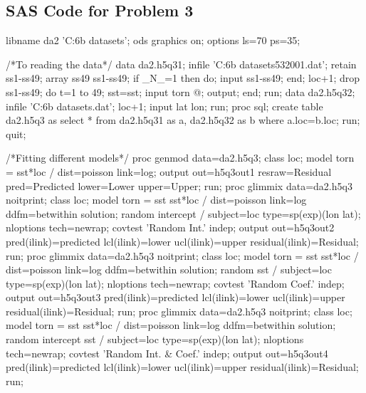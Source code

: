 \documentclass[letterpaper, 12pt]{article}
\begin{document}
\begin{appendices}
\section{SAS Code for Problem 3}
\begin{Sascode}[store=class]
libname da2 'C:\Users\psy6b\Desktop{} datasets'; 
ods graphics on; 
options ls=70 ps=35; 

/*To reading the data*/
data da2.h5q31;
   infile 'C:\Users\psy6b\Desktop{} datasets\ssttornado532001.dat';
   retain ss1-ss49;
   array ss{49} ss1-ss49;
   if _N_=1 then do; 
      input ss1-ss49;
   end;
   loc+1;
   drop ss1-ss49;
   do t=1 to 49;
      sst=ss{t};
      input torn @;
      output;
   end;
run;
data da2.h5q32;
   infile 'C:\Users\psy6b\Desktop{} datasets\MOtornlatlon.dat';
   loc+1;
   input lat lon;
   run;
proc sql;
   create table da2.h5q3
   as select * from da2.h5q31 as a, da2.h5q32 as b
   where a.loc=b.loc;
   run;
quit;

/*Fitting different models*/
proc genmod data=da2.h5q3;
   class loc;
   model torn = sst*loc / dist=poisson link=log;
   output out=h5q3out1 resraw=Residual pred=Predicted lower=Lower
      upper=Upper;
run;
proc glimmix data=da2.h5q3 noitprint;
   class loc;
   model torn = sst sst*loc / dist=poisson link=log ddfm=betwithin
      solution;
   random intercept / subject=loc type=sp(exp)(lon lat);
   nloptions tech=newrap;
   covtest 'Random Int.' indep;
   output out=h5q3out2 pred(ilink)=predicted lcl(ilink)=lower 
      ucl(ilink)=upper residual(ilink)=Residual;
run;
proc glimmix data=da2.h5q3 noitprint;
   class loc;
   model torn = sst sst*loc / dist=poisson link=log ddfm=betwithin 
      solution;
   random sst / subject=loc type=sp(exp)(lon lat);
   nloptions tech=newrap;
   covtest 'Random Coef.' indep;
   output out=h5q3out3 pred(ilink)=predicted lcl(ilink)=lower 
      ucl(ilink)=upper residual(ilink)=Residual;
run;
proc glimmix data=da2.h5q3 noitprint;
   class loc;
   model torn = sst sst*loc / dist=poisson link=log ddfm=betwithin 
      solution;
   random intercept sst / subject=loc type=sp(exp)(lon lat);
   nloptions tech=newrap;
   covtest 'Random Int. & Coef.' indep;
   output out=h5q3out4 pred(ilink)=predicted lcl(ilink)=lower 
      ucl(ilink)=upper residual(ilink)=Residual;
run;



\end{Sascode}
\end{appendices}
\end{document}
